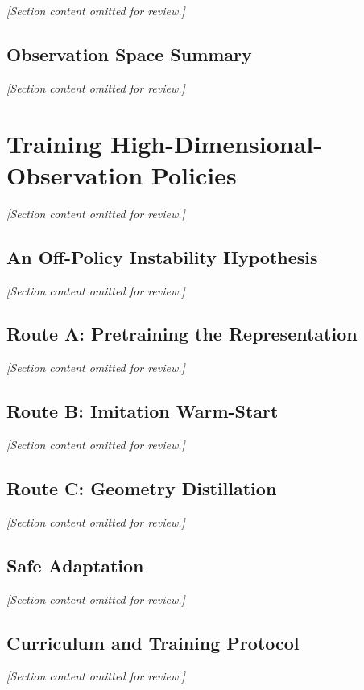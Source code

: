 \textit{[Section content omitted for review.]}

\subsection{Observation Space Summary}
\textit{[Section content omitted for review.]}

\begin{table}[H]
\centering
\caption{Observation space components}
\label{tab:observation_components}
\end{table}

\section{Training High-Dimensional-Observation Policies}
\label{sec:highdim_training}
\textit{[Section content omitted for review.]}

\subsection{An Off-Policy Instability Hypothesis}
\textit{[Section content omitted for review.]}

\subsection{Route A: Pretraining the Representation}
\textit{[Section content omitted for review.]}

\subsection{Route B: Imitation Warm-Start}
\textit{[Section content omitted for review.]}

\subsection{Route C: Geometry Distillation}
\textit{[Section content omitted for review.]}

\subsection{Safe Adaptation}
\textit{[Section content omitted for review.]}

\subsection{Curriculum and Training Protocol}
\textit{[Section content omitted for review.]}

